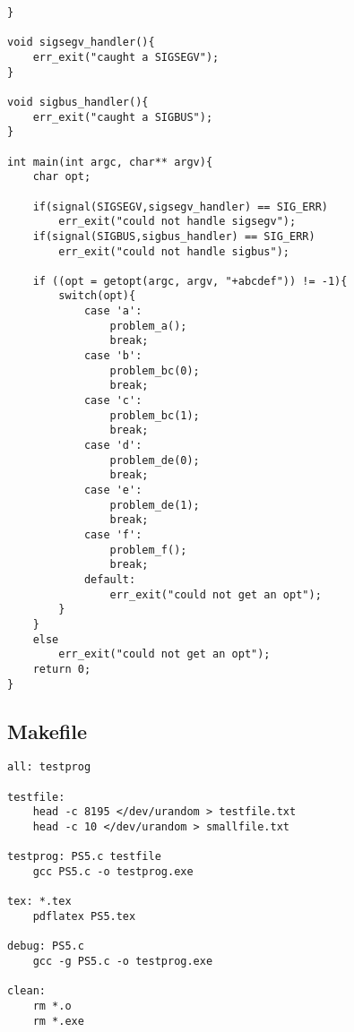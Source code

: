 \documentclass[12pt]{article}
\begin{document}
\begin{lstlisting}
}

void sigsegv_handler(){
    err_exit("caught a SIGSEGV");
}

void sigbus_handler(){
    err_exit("caught a SIGBUS");
}

int main(int argc, char** argv){
    char opt;

    if(signal(SIGSEGV,sigsegv_handler) == SIG_ERR)
        err_exit("could not handle sigsegv");
    if(signal(SIGBUS,sigbus_handler) == SIG_ERR)
        err_exit("could not handle sigbus");

    if ((opt = getopt(argc, argv, "+abcdef")) != -1){
        switch(opt){
            case 'a':
                problem_a();
                break;
            case 'b':
                problem_bc(0);
                break;
            case 'c':
                problem_bc(1);
                break;
            case 'd':
                problem_de(0);
                break;
            case 'e':
                problem_de(1);
                break;
            case 'f':
                problem_f();
                break;
            default:
                err_exit("could not get an opt");
        }
    }
    else
        err_exit("could not get an opt");
    return 0;
}
\end{lstlisting}

\subsection{Makefile}

\begin{lstlisting}
all: testprog

testfile:
    head -c 8195 </dev/urandom > testfile.txt
    head -c 10 </dev/urandom > smallfile.txt

testprog: PS5.c testfile
    gcc PS5.c -o testprog.exe

tex: *.tex
    pdflatex PS5.tex

debug: PS5.c
    gcc -g PS5.c -o testprog.exe

clean:
    rm *.o
    rm *.exe
\end{lstlisting}
\end{document}
